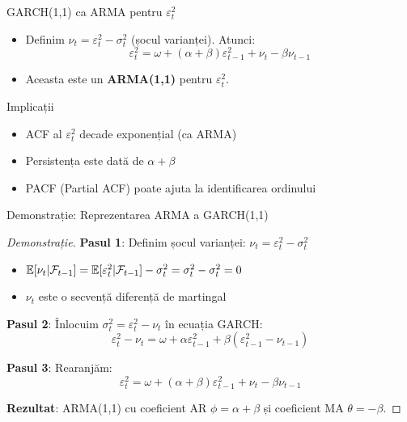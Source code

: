 \documentclass[9pt, aspectratio=169, t]{beamer}
\begin{document}
\begin{frame}{GARCH(1,1) ca ARMA pentru $\varepsilon_t^2$}
    \small
    \vspace{-0.2cm}
    \begin{prop}
        \begin{itemize}
            \item Definim $\nu_t = \varepsilon_t^2 - \sigma_t^2$ (șocul varianței). Atunci:
            \[
                \varepsilon_t^2 = \omega + (\alpha + \beta) \varepsilon_{t-1}^2 + \nu_t - \beta \nu_{t-1}
            \]
            \item Aceasta este un \textbf{ARMA(1,1)} pentru $\varepsilon_t^2$.
        \end{itemize}
    \end{prop}

    \vspace{0.3cm}

    \begin{exampleblock}{Implicații}
        \begin{itemize}
            \item ACF al $\varepsilon_t^2$ decade exponențial (ca ARMA)
            \item Persistența este dată de $\alpha + \beta$
            \item PACF (Partial ACF) poate ajuta la identificarea ordinului
        \end{itemize}
    \end{exampleblock}
\end{frame}

\begin{frame}{Demonstrație: Reprezentarea ARMA a GARCH(1,1)}
    \small
    \begin{proof}[Demonstrație]
        \textbf{Pasul 1}: Definim șocul varianței: $\nu_t = \varepsilon_t^2 - \sigma_t^2$
        \begin{itemize}
            \item $\mathbb{E}[\nu_t | \mathcal{F}_{t-1}] = \mathbb{E}[\varepsilon_t^2 | \mathcal{F}_{t-1}] - \sigma_t^2 = \sigma_t^2 - \sigma_t^2 = 0$
            \item $\nu_t$ este o secvență diferență de martingal
        \end{itemize}

        \vspace{0.2cm}
        \textbf{Pasul 2}: Înlocuim $\sigma_t^2 = \varepsilon_t^2 - \nu_t$ în ecuația GARCH:
        \[
            \varepsilon_t^2 - \nu_t = \omega + \alpha \varepsilon_{t-1}^2 + \beta (\varepsilon_{t-1}^2 - \nu_{t-1})
        \]

        \textbf{Pasul 3}: Rearanjăm:
        \[
            \varepsilon_t^2 = \omega + (\alpha + \beta) \varepsilon_{t-1}^2 + \nu_t - \beta \nu_{t-1}
        \]

        \textbf{Rezultat}: ARMA(1,1) cu coeficient AR $\phi = \alpha + \beta$ și coeficient MA $\theta = -\beta$.
    \end{proof}
\end{frame}
\end{document}
